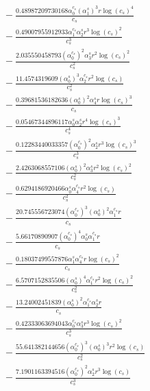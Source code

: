 \documentclass[10pt]{article}
\begin{document}
\begin{align*}
&{}  - \frac{0.48987209730168 \alpha_{0}^{c_s} \left(\alpha_{1}^s\right)^{3} r \log{\left(c_{s} \right)}^{4}}{c_{s}} \\
&{}  - \frac{0.49007955912933 \alpha_{1}^{c_s} \alpha_{2}^s r^{3} \log{\left(c_{s} \right)}^{2}}{c_{s}^{3}} \\
&{}  - \frac{2.035550458793 \left(\alpha_{0}^{c_s}\right)^{2} \alpha_{3}^s r^{2} \log{\left(c_{s} \right)}^{2}}{c_{s}^{2}} \\
&{}  - \frac{11.4574319609 \left(\alpha_{0}^s\right)^{3} \alpha_{2}^{c_s} r^{2} \log{\left(c_{s} \right)}}{c_{s}^{2}} \\
&{}  - \frac{0.39681536182636 \left(\alpha_{0}^s\right)^{2} \alpha_{4}^s r \log{\left(c_{s} \right)}^{3}}{c_{s}} \\
&{}  - \frac{0.05467344896117 \alpha_{0}^s \alpha_{2}^s r^{4} \log{\left(c_{s} \right)}^{3}}{c_{s}^{4}} \\
&{}  - \frac{0.12283440033357 \left(\alpha_{0}^{c_s}\right)^{2} \alpha_{2}^s r^{3} \log{\left(c_{s} \right)}^{3}}{c_{s}^{3}} \\
&{}  - \frac{2.4263068557106 \left(\alpha_{0}^s\right)^{2} \alpha_{3}^s r^{2} \log{\left(c_{s} \right)}^{2}}{c_{s}^{2}} \\
&{}  - \frac{0.6294186920466 \alpha_{0}^s \alpha_{4}^{c_s} r^{2} \log{\left(c_{s} \right)}}{c_{s}^{2}} \\
&{}  - \frac{20.745556723074 \left(\alpha_{0}^{c_s}\right)^{3} \left(\alpha_{0}^s\right)^{2} \alpha_{1}^{c_s} r}{c_{s}} \\
&{}  - \frac{5.66170890907 \left(\alpha_{0}^{c_s}\right)^{4} \alpha_{0}^s \alpha_{1}^{c_s} r}{c_{s}} \\
&{}  - \frac{0.18037499557876 \alpha_{1}^s \alpha_{4}^{c_s} r \log{\left(c_{s} \right)}^{2}}{c_{s}} \\
&{}  - \frac{6.5707152835506 \left(\alpha_{0}^s\right)^{4} \alpha_{1}^{c_s} r^{2} \log{\left(c_{s} \right)}^{2}}{c_{s}^{2}} \\
&{}  - \frac{13.24002451839 \left(\alpha_{0}^s\right)^{2} \alpha_{1}^{c_s} \alpha_{2}^s r}{c_{s}} \\
&{}  - \frac{0.42333063694043 \alpha_{0}^{c_s} \alpha_{3}^s r^{3} \log{\left(c_{s} \right)}^{2}}{c_{s}^{3}} \\
&{}  - \frac{55.641382144656 \left(\alpha_{0}^{c_s}\right)^{3} \left(\alpha_{0}^s\right)^{3} r^{2} \log{\left(c_{s} \right)}}{c_{s}^{2}} \\
&{}  - \frac{7.1901163394516 \left(\alpha_{0}^{c_s}\right)^{2} \alpha_{2}^s r^{3} \log{\left(c_{s} \right)}}{c_{s}^{3}} \\

\end{align*}
\end{document}
